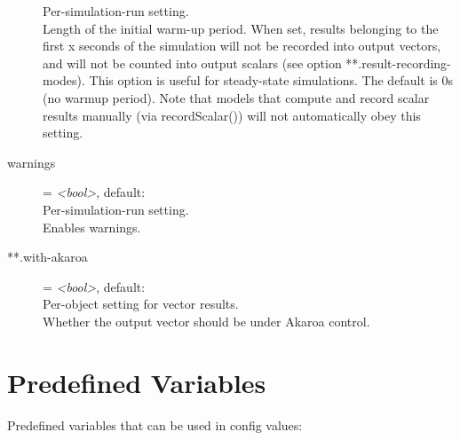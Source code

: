 \begin{description}
    Per-simulation-run setting.\\
    Length of the initial warm-up period. When set, results belonging to the
    first x seconds of the simulation will not be recorded into output vectors,
    and will not be counted into output scalars (see option
    **.result-recording-modes). This option is useful for steady-state
    simulations. The default is 0s (no warmup period). Note that models that
    compute and record scalar results manually (via recordScalar()) will not
    automatically obey this setting.
\item[warnings] = \textit{<bool>}, default: \\
    Per-simulation-run setting.\\
    Enables warnings.
\item[**.with-akaroa] = \textit{<bool>}, default: \\
    Per-object setting for vector results.\\
    Whether the output vector should be under Akaroa control.
\end{description}

\section{Predefined Variables}
\label{sec:config-options:predefined-variables}

Predefined variables that can be used in config values:

